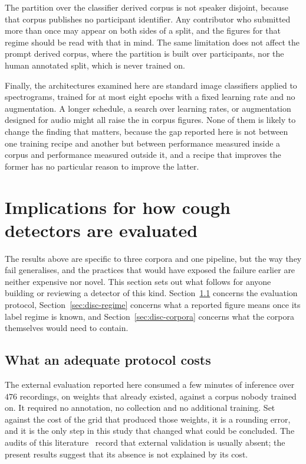 \documentclass[pdflatex,sn-mathphys-num]{sn-jnl}
\begin{document}
The partition over the classifier derived corpus is not speaker disjoint, because that
corpus publishes no participant identifier. Any contributor who submitted more than once
may appear on both sides of a split, and the figures for that regime should be read with
that in mind. The same limitation does not affect the prompt derived corpus, where the
partition is built over participants, nor the human annotated split, which is never
trained on.

Finally, the architectures examined here are standard image classifiers applied to
spectrograms, trained for at most eight epochs with a fixed learning rate and no
augmentation. A longer schedule, a search over learning rates, or augmentation designed for
audio might all raise the in corpus figures. None of them is likely to change the finding
that matters, because the gap reported here is not between one training recipe and another
but between performance measured inside a corpus and performance measured outside it, and
a recipe that improves the former has no particular reason to improve the latter.

\section{Implications for how cough detectors are evaluated}\label{sec:discussion}

The results above are specific to three corpora and one pipeline, but the way they fail
generalises, and the practices that would have exposed the failure earlier are neither
expensive nor novel. This section sets out what follows for anyone building or reviewing
a detector of this kind. Section~\ref{sec:disc-protocol} concerns the evaluation protocol,
Section~\ref{sec:disc-regime} concerns what a reported figure means once its label regime
is known, and Section~\ref{sec:disc-corpora} concerns what the corpora themselves would
need to contain.

\subsection{What an adequate protocol costs}\label{sec:disc-protocol}

The external evaluation reported here consumed a few minutes of inference over $476$
recordings, on weights that already existed, against a corpus nobody trained on. It
required no annotation, no collection and no additional training. Set against the cost of
the grid that produced those weights, it is a rounding error, and it is the only step in
this study that changed what could be concluded. The audits of this
literature~\cite{roberts2021, han2022} record that external validation is usually absent;
the present results suggest that its absence is not explained by its cost.
\end{document}
